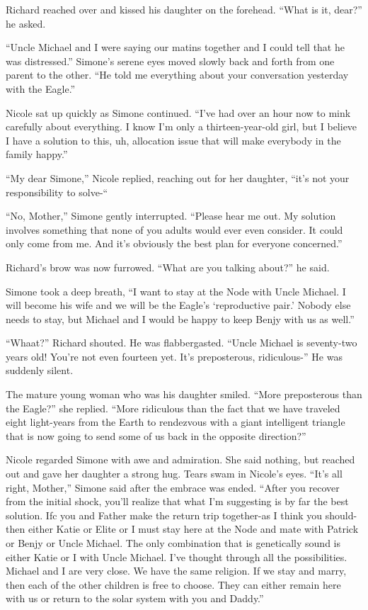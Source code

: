 \documentclass[]{article}
\begin{document}
{Richard reached over and kissed his daughter on the forehead. “What is it, dear?” he asked.

“Uncle Michael and I were saying our matins together and I could tell that he was distressed.” Simone’s serene eyes moved slowly back and forth from one parent to the other. “He told me everything about your conversation yesterday with the Eagle.”

Nicole sat up quickly as Simone continued. “I’ve had over an hour now to mink carefully about everything. I know I’m only a thirteen-year-old girl, but I believe I have a solution to this, uh, allocation issue that will make everybody in the family happy.”

“My dear Simone,” Nicole replied, reaching out for her daughter, “it’s not your responsibility to solve-“

“No, Mother,” Simone gently interrupted. “Please hear me out. My solution involves something that none of you adults would ever even consider. It could only come from me. And it’s obviously the best plan for everyone concerned.”

Richard’s brow was now furrowed. “What are you talking about?” he said.

Simone took a deep breath, “I want to stay at the Node with Uncle Michael. I will become his wife and we will be the Eagle’s ‘reproductive pair.’ Nobody else needs to stay, but Michael and I would be happy to keep Benjy with us as well.”

“Whaat?” Richard shouted. He was flabbergasted. “Uncle Michael is seventy-two years old! You’re not even fourteen yet. It’s preposterous, ridiculous-” He was suddenly silent.

The mature young woman who was his daughter smiled. “More preposterous than the Eagle?” she replied. “More ridiculous than the fact that we have traveled eight light-years from the Earth to rendezvous with a giant intelligent triangle that is now going to send some of us back in the opposite direction?”

Nicole regarded Simone with awe and admiration. She said nothing, but reached out and gave her daughter a strong hug. Tears swam in Nicole’s eyes. “It’s all right, Mother,” Simone said after the embrace was ended. “After you recover from the initial shock, you’ll realize that what I’m suggesting is by far the best solution. Ifc you and Father make the return trip together-as I think you should-then either Katie or Elite or I must stay here at the Node and mate with Patrick or Benjy or Uncle Michael. The only combination that is genetically sound is either Katie or I with Uncle Michael. I’ve thought through all the possibilities. Michael and I are very close. We have the same religion. If we stay and marry, then each of the other children is free to choose. They can either remain here with us or return to the solar system with you and Daddy.”

}
\end{document}
